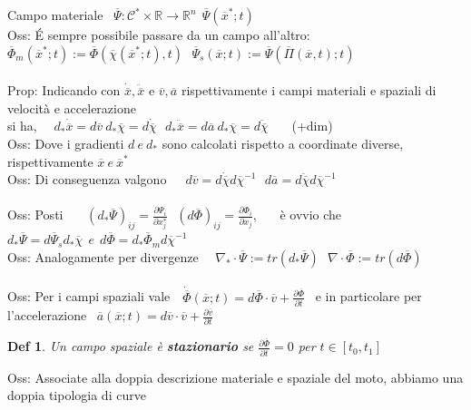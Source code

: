 \documentclass{article}
\theoremstyle{unnumbered}
\newtheorem* {theoremT}{Def}
\theoremstyle{unnumbered1}
\newenvironment{defi}{\begin{gBox}\begin{theoremT}}{\end{theoremT}\end{gBox}}
\begin{document}
Campo materiale \ $\overline{\Psi}:\mathcal{C}^*\times\mathbb{R}\rightarrow\mathbb{R}^n \ \ \overline{\Psi}(\overline{x}^*;t)$\\
%
%
%
Oss: É sempre possibile passare da un campo all'altro:\ \ $\overline{\Phi}_m(\overline{x}^*;t):= \overline{\Phi}(\overline{\chi}(\overline{x}^*;t),t) \ \ \ \overline{\Psi}_s(\overline{x};t):= \overline{\Psi}(\overline{\Pi}(\overline{x},t);t)$\\ \\
%
%
%
Prop: Indicando con $\dot{\overline{x}}, \ddot{\overline{x}}$ e $\overline{v},\overline{a}$ rispettivamente i campi materiali e spaziali di velocità e accelerazione\\
\phantom{Prop: }si ha, \ \ $d_*\dot{\overline{x}}=d\overline{v}\ d_*\overline{\chi}= d\dot{\overline{\chi}} \ \ \ d_*\ddot{\overline{x}}=d\overline{a}\ d_*\overline{\chi}= d\ddot{\overline{\chi}}$ \ \ \ (+dim)\\
%
Oss: Dove i gradienti $d \ e \ d_*$ sono calcolati rispetto a coordinate diverse, rispettivamente $\overline{x} \ e \ \overline{x}^*$ \\
%
Oss: Di conseguenza valgono\ \ \ $d\overline{v}=d\dot{\overline{\chi}}d\overline{\chi}^{-1} \ \ \ d\overline{a}=d\ddot{\overline{\chi}}d\overline{\chi}^{-1}$\\ \\
%
%
%
Oss: Posti \ \ \ $(d_*\overline{\Psi})_{ij}=\frac{\partial \Psi_i}{\partial x^*_j} \ \ \ (d\overline{\Phi})_{ij}=\frac{\partial \Phi_i}{\partial x_j}$, \ \ \ è ovvio che \ $d_*\overline{\Psi}=d\overline{\Psi}_sd_*\overline{\chi} \ \ e \ \ d\overline{\Phi}=d_*\overline{\Phi}_md\overline{\chi}^{-1}$ \\
%
%
Oss: Analogamente per divergenze \ \ $\nabla_*\cdot\overline{\Psi}:=tr(d_*\overline{\Psi}) \ \ \ \nabla\cdot\overline{\Phi}:=tr(d\overline{\Phi}) $\\ \\
%
%
%
Oss: Per i campi spaziali vale\ \ $\dot{\overline{\Phi}}(\overline{x};t) = d\overline{\Phi}\cdot\overline{v} + \frac{\partial\overline{\Phi}}{\partial t}$ \ e in particolare per l'accelerazione \ $\overline{a}(\overline{x};t)= d\overline{v}\cdot\overline{v} + \frac{\partial\overline{v}}{\partial t}$\\
%
%
%
\begin{defi}
Un campo spaziale è \textbf{stazionario} se $\frac{\partial \overline{\Phi}}{\partial t}=0$ per $t \in [t_0,t_1]$
\end{defi}
%
Oss: Associate alla doppia descrizione materiale e spaziale del moto, abbiamo una doppia tipologia di curve\\
\end{document}
